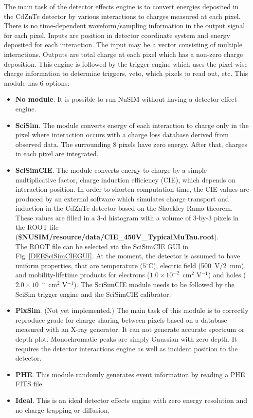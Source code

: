 The main task of the detector effects engine is to convert energies
deposited in the CdZnTe detector by various interactions to charges
measured at each pixel.
There is no time-dependent waveform/sampling information in the output
signal for each pixel.
Inputs are position in detector coordinate system and energy
deposited for each interaction.
The input may be a vector consisting of multiple interactions.
Outputs are total charge at each pixel which has a non-zero charge
deposition.
This engine is followed by the trigger engine which uses the pixel-wise
charge information to determine triggers, veto, which pixels to read
out, etc. This module has 6 options:
\begin{itemize}
 \item \textbf{No module}.
       It is possible to run NuSIM without having a detector effect engine.
 \item \textbf{SciSim}.
       The module converts energy of each interaction to charge only
       in the pixel where interaction occurs with a charge loss database
       derived from observed data.
       The surrounding 8 pixels have zero energy.
       After that, charges in each pixel are integrated.
 \item \textbf{SciSimCIE}.
       The module converts energy to charge
       by a simple multiplicative factor, charge induction efficiency
       (CIE), which depends on interaction position.
       In order to shorten computation time, the CIE values are produced
       by an external software which simulates charge transport and
       induction in the CdZnTe detector based on the Shockley-Ramo theorem.
       These values are filled in a 3-d histogram with a volume of 3-by-3
       pixels in the ROOT file\\
       (\textbf{\${NUSIM}/resource/data/CIE\_450V\_TypicalMuTau.root}).\\
       The ROOT file can be selected via the SciSimCIE GUI in
       Fig~\ref{DEESciSimCIEGUI}.
       At the moment, the detector is assumed to have uniform properties,
       that are temperature ($5{}^\circ\mathrm{C}$),
       electric field (500~V/2~mm), and mobility-lifetime products for
       electrons ($1.0 \times 10^{-2}$~cm$^{2}$ V$^{-1}$)
       and holes ($2.0 \times 10^{-5}$~cm$^{2}$ V$^{-1}$).
       The SciSimCIE module needs to be followed by the SciSim trigger
       engine and the SciSimCIE calibrator.
 \item \textbf{PixSim}.
       (Not yet implemented.)
       The main task of this module is to correctly reproduce grade for
       charge sharing between pixels based on a database measured with
       an X-ray generator. It can not generate accurate spectrum or depth
       plot. Monochromatic peaks are simply Gaussian with zero depth.
       It requires the detector interactions engine as well as incident
       position to the detector.
 \item \textbf{PHE}.
       This module randomly generates event information by reading
       a PHE FITS file.
 \item \textbf{Ideal}.
       This is an ideal detector effects engine with zero energy
       resolution and no charge trapping or diffusion.
\end{itemize}


